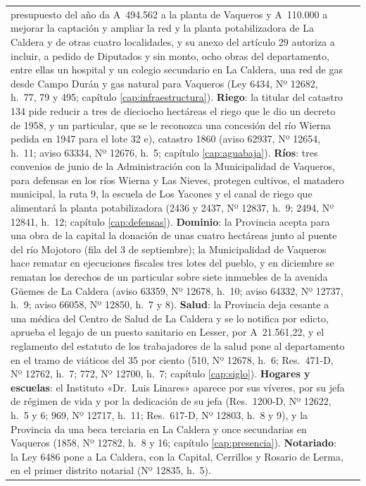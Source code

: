 \begin{longtable}{@{}p{2.7cm}p{10.3cm}@{}}
presupuesto del año da A~494.562 a la planta de Vaqueros y A~110.000 a mejorar la captación y ampliar la red y la planta potabilizadora de La Caldera y de otras cuatro localidades, y su anexo del artículo 29 autoriza a incluir, a pedido de Diputados y sin monto, ocho obras del departamento, entre ellas un hospital y un colegio secundario en La Caldera, una red de gas desde Campo Durán y gas natural para Vaqueros (Ley 6434, Nº 12682, h.\ 77, 79 y 495; capítulo \ref{cap:infraestructura}). \textbf{Riego}: la titular del catastro 134 pide reducir a tres de dieciocho hectáreas el riego que le dio un decreto de 1958, y un particular, que se le reconozca una concesión del río Wierna pedida en 1947 para el lote 32 e), catastro 1860 (aviso 62937, Nº 12654, h.\ 11; aviso 63334, Nº 12676, h.\ 5; capítulo \ref{cap:aguabaja}). \textbf{Ríos}: tres convenios de junio de la Administración con la Municipalidad de Vaqueros, para defensas en los ríos Wierna y Las Nieves, protegen cultivos, el matadero municipal, la ruta 9, la escuela de Los Yacones y el canal de riego que alimentará la planta potabilizadora (2436 y 2437, Nº 12837, h.\ 9; 2494, Nº 12841, h.\ 12; capítulo \ref{cap:defensas}). \textbf{Dominio}: la Provincia acepta para una obra de la capital la donación de unas cuatro hectáreas junto al puente del río Mojotoro (fila del 3 de septiembre); la Municipalidad de Vaqueros hace rematar en ejecuciones fiscales tres lotes del pueblo, y en diciembre se rematan los derechos de un particular sobre siete inmuebles de la avenida Güemes de La Caldera (aviso 63359, Nº 12678, h.\ 10; aviso 64332, Nº 12737, h.\ 9; aviso 66058, Nº 12850, h.\ 7 y 8). \textbf{Salud}: la Provincia deja cesante a una médica del Centro de Salud de La Caldera y se lo notifica por edicto, aprueba el legajo de un puesto sanitario en Lesser, por A~21.561,22, y el reglamento del estatuto de los trabajadores de la salud pone al departamento en el tramo de viáticos del 35 por ciento (510, Nº 12678, h.\ 6; Res.\ 471-D, Nº 12762, h.\ 7; 772, Nº 12700, h.\ 7; capítulo \ref{cap:siglo}). \textbf{Hogares y escuelas}: el Instituto «Dr.\ Luis Linares» aparece por sus víveres, por su jefa de régimen de vida y por la dedicación de su jefa (Res.\ 1200-D, Nº 12622, h.\ 5 y 6; 969, Nº 12717, h.\ 11; Res.\ 617-D, Nº 12803, h.\ 8 y 9), y la Provincia da una beca terciaria en La Caldera y once secundarias en Vaqueros (1858, Nº 12782, h.\ 8 y 16; capítulo \ref{cap:presencia}). \textbf{Notariado}: la Ley 6486 pone a La Caldera, con la Capital, Cerrillos y Rosario de Lerma, en el primer distrito notarial (Nº 12835, h.\ 5). \\

\end{longtable}
